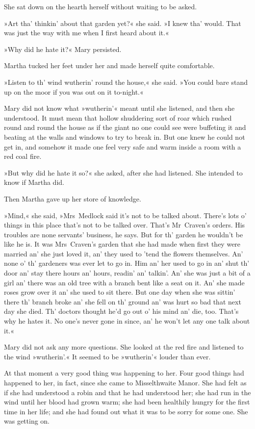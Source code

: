 She sat down on the hearth herself without waiting to be asked.

»Art tha' thinkin' about that garden yet?« she said. »I knew tha' would. That was just the way with me when I first heard about it.«

»Why did he hate it?« Mary persisted.

Martha tucked her feet under her and made herself quite comfortable.

»Listen to th' wind wutherin' round the house,« she said. »You could bare stand up on the moor if you was out on it to-night.«

Mary did not know what »wutherin'« meant until she listened, and then she understood. It must mean that hollow shuddering sort of roar which rushed round and round the house as if the giant no one could see were buffeting it and beating at the walls and windows to try to break in. But one knew he could not get in, and somehow it made one feel very safe and warm inside a room with a red coal fire.

»But why did he hate it so?« she asked, after she had listened. She intended to know if Martha did.

Then Martha gave up her store of knowledge.

»Mind,« she said, »Mrs~Medlock said it's not to be talked about. There's lots o' things in this place that's not to be talked over. That's Mr~Craven's orders. His troubles are none servants' business, he says. But for th' garden he wouldn't be like he is. It was Mrs~Craven's garden that she had made when first they were married an' she just loved it, an' they used to 'tend the flowers themselves. An' none o' th' gardeners was ever let to go in. Him an' her used to go in an' shut th' door an' stay there hours an' hours, readin' an' talkin'. An' she was just a bit of a girl an' there was an old tree with a branch bent like a seat on it. An' she made roses grow over it an' she used to sit there. But one day when she was sittin' there th' branch broke an' she fell on th' ground an' was hurt so bad that next day she died. Th' doctors thought he'd go out o' his mind an' die, too. That's why he hates it. No one's never gone in since, an' he won't let any one talk about it.«

Mary did not ask any more questions. She looked at the red fire and listened to the wind »wutherin'.« It seemed to be »wutherin'« louder than ever.

At that moment a very good thing was happening to her. Four good things had happened to her, in fact, since she came to Misselthwaite Manor. She had felt as if she had understood a robin and that he had understood her; she had run in the wind until her blood had grown warm; she had been healthily hungry for the first time in her life; and she had found out what it was to be sorry for some one. She was getting on.

